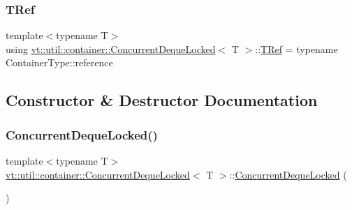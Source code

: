 \mbox{\label{structvt_1_1util_1_1container_1_1_concurrent_deque_locked_a4451b0e7f6c8aa741f98a77a9fed353e}} 
\subsubsection{\texorpdfstring{T\+Ref}{TRef}}
{\footnotesize\ttfamily template$<$typename T$>$ \\
using \hyperlink{structvt_1_1util_1_1container_1_1_concurrent_deque_locked}{vt\+::util\+::container\+::\+Concurrent\+Deque\+Locked}$<$ T $>$\+::\hyperlink{structvt_1_1util_1_1container_1_1_concurrent_deque_locked_a4451b0e7f6c8aa741f98a77a9fed353e}{T\+Ref} =  typename Container\+Type\+::reference}



\subsection{Constructor \& Destructor Documentation}
\mbox{\label{structvt_1_1util_1_1container_1_1_concurrent_deque_locked_adf6fc93e74d56a37cf1d0692a29e6ef3}} 
\subsubsection{\texorpdfstring{Concurrent\+Deque\+Locked()}{ConcurrentDequeLocked()}\hspace{0.1cm}{\footnotesize\ttfamily [1/3]}}
{\footnotesize\ttfamily template$<$typename T$>$ \\
\hyperlink{structvt_1_1util_1_1container_1_1_concurrent_deque_locked}{vt\+::util\+::container\+::\+Concurrent\+Deque\+Locked}$<$ T $>$\+::\hyperlink{structvt_1_1util_1_1container_1_1_concurrent_deque_locked}{Concurrent\+Deque\+Locked} (\begin{DoxyParamCaption}{ }\end{DoxyParamCaption})\hspace{0.3cm}{\ttfamily [inline]}}

